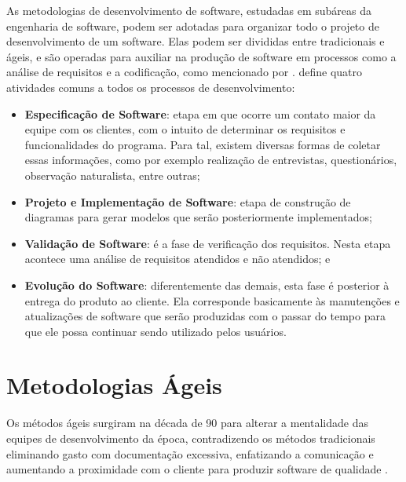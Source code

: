 As metodologias de desenvolvimento de software, estudadas em subáreas da engenharia de software, podem ser adotadas para organizar todo o projeto de desenvolvimento de um software. Elas podem ser divididas entre tradicionais e ágeis, e são operadas para auxiliar na produção de software em processos como a análise de requisitos e a codificação, como mencionado por .  define quatro atividades comuns a todos os processos de desenvolvimento:

\begin{itemize}
 \item \textbf{Especificação de Software}: etapa em que ocorre um contato maior da equipe com os clientes, com o intuito de determinar os requisitos e funcionalidades do programa. Para tal, existem diversas formas de coletar essas informações, como por exemplo realização de entrevistas, questionários, observação naturalista, entre outras;
 \item \textbf{Projeto e Implementação de Software}: etapa de construção de diagramas para gerar modelos que serão posteriormente implementados;
 \item \textbf{Validação de Software}: é a fase de verificação dos requisitos. Nesta etapa acontece uma análise de requisitos atendidos e não atendidos; e
 \item \textbf{Evolução do Software}: diferentemente das demais, esta fase é posterior à entrega do produto ao cliente. Ela corresponde basicamente às manutenções e atualizações de software que serão produzidas com o passar do tempo para que ele possa continuar sendo utilizado pelos usuários.
\end{itemize}

\hspace{2.5cm}

\section{Metodologias Ágeis}
\label{sec:metodologiaagil}
\hspace{2.5cm}

Os métodos ágeis surgiram na década de 90 para alterar a mentalidade das equipes de desenvolvimento da época, contradizendo os métodos tradicionais eliminando gasto com documentação excessiva, enfatizando a comunicação e aumentando a proximidade com o cliente para produzir software de qualidade .


